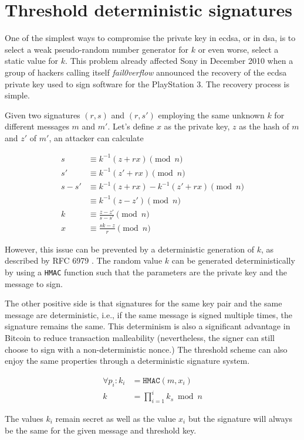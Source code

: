 \section{Threshold deterministic signatures}

One of the simplest ways to compromise the private key in \gls{ecdsa}, or in
\gls{dsa}, is to select a weak pseudo-random number generator for $k$ or even
worse, select a static value for $k$. This problem already affected Sony in
December 2010 when a group of hackers calling itself \textit{fail0verflow}
announced the recovery of the \gls{ecdsa} private key used to sign software for
the PlayStation 3. The recovery process is simple.

Given two signatures $(r, s)$ and $(r, s')$ employing the same unknown $k$ for
different messages $m$ and $m'$. Let's define $x$ as the private key, $z$ as the
hash of $m$ and $z'$ of $m'$, an attacker can calculate

\begin{equation}
\begin{split}
  s &\equiv k^{-1} (z + rx) \pmod n \\
  s' &\equiv k^{-1} (z' + rx) \pmod n \\
  s - s' &\equiv k^{-1} (z + rx) - k^{-1} (z' + rx) \pmod n \\
         &\equiv k^{-1} (z - z') \pmod n \\
  k &\equiv \frac{z - z'}{s - s'} \pmod n \\
  x &\equiv \frac{sk - z}{r} \pmod n
\end{split}
\end{equation}

However, this issue can be prevented by a deterministic generation of $k$, as
described by RFC 6979 \cite{rfc6979}. The random value $k$ can be generated
deterministically by using a \texttt{HMAC} function such that the parameters are
the private key and the message to sign.

The other positive side is that signatures for the same key pair and the same
message are deterministic, i.e., if the same message is signed multiple times, the
signature remains the same. This determinism is also a significant advantage in
Bitcoin to reduce transaction malleability (nevertheless, the signer can still
choose to sign with a non-deterministic nonce.) The threshold scheme can also
enjoy the same properties through a deterministic signature system.

\begin{equation}
\begin{split}
  \forall p_i : k_i &= \texttt{HMAC}(m, x_i) \\
  k &= \prod_{i=1}^{i} k_s \bmod n
\end{split}
\end{equation}

The values $k_i$ remain secret as well as the value $x_i$
but the signature will always be the same for the given message and threshold
key.
